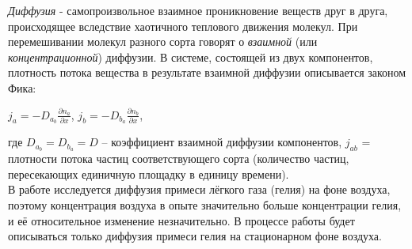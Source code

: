 \documentclass[a4paper,12pt]{article} %
\begin{document}
\item {\sl Диффузия} - самопроизвольное взаимное проникновение веществ друг в друга, происходящее вследствие хаотичного теплового движения молекул. При перемешивании молекул разного сорта говорят о {\sl взаимной} (или {\sl концентрационной}) диффузии.
В системе, состоящей из двух компонентов, плотность потока вещества в результате взаимной диффузии описывается законом Фика:
\begin{center}
$\displaystyle j_a = -D_a_b\frac{\partial n_a}{\partial x}$, $\displaystyle j_b = -D_b_a\frac{\partial n_b}{\partial x}$,
\end{center}
где $D_a_b = D_b_a = D$ -- коэффициент взаимной диффузии компонентов, $j_{ab}$ = плотности потока частиц соответствующего сорта (количество частиц, пересекающих единичную площадку в единицу времени).\\
В работе исследуется диффузия примеси лёгкого газа (гелия) на фоне воздуха, поэтому концентрация воздуха в опыте значительно больше концентрации гелия, и её относительное изменение незначительно. В процессе работы будет описываться только диффузия примеси гелия на стационарном фоне воздуха.\\
\end{document}
